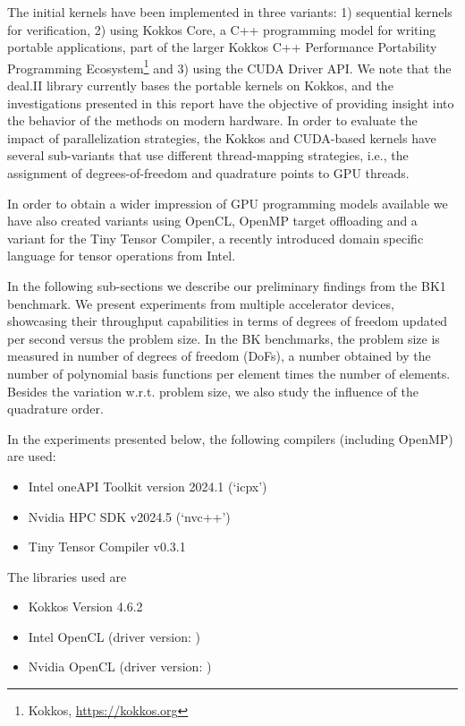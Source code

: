 \documentclass[a4paper,12pt]{article}
\begin{document}
The initial kernels have been implemented in three variants: 1) sequential kernels for verification, 2) using Kokkos Core, a C++ programming model for writing portable applications, part of the larger Kokkos C++ Performance Portability Programming Ecosystem\footnote{Kokkos, \url{https://kokkos.org}} and 3) using the CUDA Driver API. We note that the deal.II library currently bases the portable kernels on Kokkos, and the investigations presented in this report have the objective of providing insight into the behavior of the methods on modern hardware. In order to evaluate the impact of parallelization strategies, the Kokkos and CUDA-based kernels have several sub-variants that use different thread-mapping strategies, i.e., the assignment of degrees-of-freedom and quadrature points to GPU threads.

In order to obtain a wider impression of GPU programming models available we have also created variants using OpenCL, OpenMP target offloading and a variant for the Tiny Tensor Compiler, a recently introduced domain specific language for tensor operations from Intel. 

In the following sub-sections we describe our preliminary findings from the BK1 benchmark.
We present experiments from multiple accelerator devices, showcasing their throughput capabilities in terms of degrees of freedom updated per second versus the problem size.
In the BK benchmarks, the problem size is measured in number of degrees of freedom (DoFs), a number obtained by the number of polynomial basis functions per element times the number of elements.
Besides the variation w.r.t. problem size, we also study the influence of the quadrature order.

In the experiments presented below, the following compilers (including OpenMP) are used:
\begin{itemize}
    \item Intel oneAPI Toolkit version 2024.1 (`icpx')
    \item Nvidia HPC SDK v2024.5 (`nvc++')
    \item Tiny Tensor Compiler v0.3.1
\end{itemize}
The libraries used are
\begin{itemize}
    \item Kokkos Version 4.6.2
    \item Intel OpenCL (driver version: )
    \item Nvidia OpenCL (driver version: )
\end{itemize}
\end{document}

